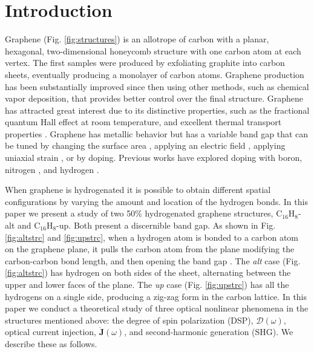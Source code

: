 \documentclass[pss]{wiley2sp} %
\begin{document}
\maketitle


\section{Introduction}\label{sec:intro}

Graphene (Fig. \ref{fig:structures}) is an allotrope of carbon with a planar, hexagonal, two-dimensional honeycomb structure with one carbon atom at each vertex. The first samples were produced by exfoliating graphite into carbon sheets, eventually producing a monolayer of carbon atoms. Graphene production has been substantially improved since then using other methods, such as chemical vapor deposition, that provides better control over the final structure. Graphene has attracted great interest due to its distinctive properties, such as the fractional quantum Hall effect at room temperature, and excellent thermal transport properties \cite{geimNM07,geimNM07,reinaNL08,bottegoniAPL13,balandinNL08}. Graphene has metallic behavior but has a variable band gap that can be tuned by changing the surface area \cite{hanPRL07}, applying an electric field \cite{zhangN09}, applying uniaxial strain \cite{niACSN08}, or by doping. Previous works have explored doping with boron, nitrogen \cite{guoIJ11}, and hydrogen \cite{eliasS09,guisingerNL09,samarakoonACSN10}.

When graphene is hydrogenated it is possible to obtain different spatial configurations by varying the amount and location of the hydrogen bonds. In this paper we present a study of two 50\% hydrogenated graphene structures, C$_{16}$H$_{8}$-alt and C$_{16}$H$_{8}$-up. Both present a discernible band gap. As shown in Fig. \ref{fig:altstrc} and \ref{fig:upstrc}, when a hydrogen atom is bonded to a carbon atom on the graphene plane, it pulls the carbon atom from the plane modifying the carbon-carbon bond length, and then opening the band gap \cite{samarakoonACSN10}. The \emph{alt} case (Fig. \ref{fig:altstrc}) has hydrogen on both sides of the sheet, alternating between the upper and lower faces of the plane. The \emph{up} case (Fig. \ref{fig:upstrc}) has all the hydrogens on a single side, producing a zig-zag form in the carbon lattice. In this paper we conduct a theoretical study of three optical nonlinear phenomena in the structures mentioned above: the degree of spin polarization (DSP), $\mathcal{D}(\omega)$, optical current injection, $\mathbf{\dot{J}}(\omega)$, and second-harmonic generation (SHG). We describe these as follows.
\end{document}
